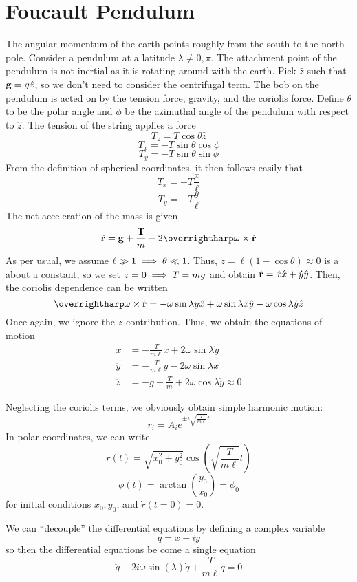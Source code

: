 \section{Foucault Pendulum}
The angular momentum of the earth points roughly from the south to the north pole. Consider a pendulum at a latitude \(\lambda\neq 0,\pi\). The attachment point of the pendulum is not inertial as it is rotating around with the earth. Pick \(\hat z\) such that \(\mathbf{g} = g\hat z\), so we don't need to consider the centrifugal term. The bob on the pendulum is acted on by the tension force, gravity, and the coriolis force. Define \(\theta\) to be the polar angle and \(\phi\) be the azimuthal angle of the pendulum with respect to \(\hat z\). The tension of the string applies a force
\[T_z = T\cos\theta\hat z\]
\[T_x = -T\sin\theta\cos\phi\]
\[T_y = -T\sin\theta\sin\phi\]
From the definition of spherical coordinates, it then follows easily that
\[T_x = -T\frac{x}{\ell}\]
\[T_y = -T\frac{y}{\ell}\]
The net acceleration of the mass is given
\[\ddot{\vb r} = \vb{g}+\frac{\vb T}{m}-2\vv \omega\times\dot{\vb r}\]
As per usual, we assume \(\ell\gg1\implies \theta\ll 1\). Thus, \(z = \ell(1-\cos\theta)\approx 0\) is a about a constant, so we set \(\dot z = 0\implies T=mg\) and obtain \(\dot{\mathbf{r}} = \dot x \hat x + \dot y \hat y\). Then, the coriolis dependence can be written
\[\vv\omega\times\dot{\vb r} = -\omega\sin\lambda\dot y\hat x + \omega\sin\lambda\dot x \hat y - \omega\cos\lambda\dot y\hat z\]
Once again, we ignore the \(z\) contribution. Thus, we obtain the equations of motion
\begin{subequations}
	\begin{align*}
		\ddot x &=-\frac{T}{m\ell}x+2\omega\sin\lambda\dot y\\
		\ddot y &=-\frac{T}{m\ell}y-2\omega\sin\lambda\dot x\\
		\ddot z &= -g + \frac{T}{m}+2\omega\cos\lambda\dot y \approx 0
	\end{align*}
\end{subequations}

Neglecting the coriolis terms, we obviously obtain simple harmonic motion:
\[r_i = A_ie^{\pm i\sqrt{\frac{T}{m\ell}}t}\]
In polar coordinates, we can write
\[r(t) = \sqrt{x_0^2+y_0^2}\cos\left(\sqrt{\frac{T}{m\ell}}t\right)\]
\[\phi(t) = \arctan\left(\frac{y_0}{x_0}\right) = \phi_0\]
for initial conditions \(x_0,y_0\), and \(\dot r(t=0)=0\).

We can ``decouple'' the differential equations by defining a complex variable
\[q=x+iy\]
so then the differential equations be come a single equation
\[\ddot q -2i\omega\sin(\lambda)\dot q+\frac{T}{m\ell}q=0\]

